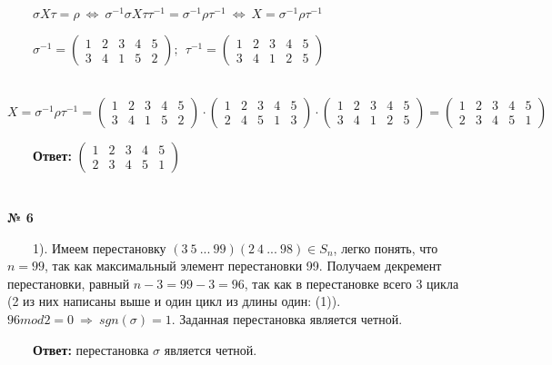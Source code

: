 \documentclass[a4paper, 12pt]{article}
\begin{document}
    \\
    \par \ \ \ \ $\sigma X \tau = \rho \ \Leftrightarrow \ \sigma^{-1} \sigma X \tau \tau^{-1} = \sigma^{-1} \rho \tau^{-1} \ \Leftrightarrow \ X = \sigma^{-1} \rho \tau^{-1}$
    \\
    \par \ \ \ \ $\sigma^{-1} = \begin{pmatrix}1 & 2 & 3 & 4 & 5\\3 & 4 & 1 & 5 & 2\end{pmatrix}; \ \ \tau^{-1} = \begin{pmatrix}1 & 2 & 3 & 4 & 5\\3 & 4 & 1 & 2 & 5\end{pmatrix}$
    \\
    \par \ \ \ \ $X = \sigma^{-1} \rho \tau^{-1} = \begin{pmatrix}1 & 2 & 3 & 4 & 5\\3 & 4 & 1 & 5 & 2\end{pmatrix} \cdot \begin{pmatrix}1 & 2 & 3 & 4 & 5\\2 & 4 & 5 & 1 & 3 \end{pmatrix} \cdot \begin{pmatrix}1 & 2 & 3 & 4 & 5\\3 & 4 & 1 & 2 & 5\end{pmatrix} = \begin{pmatrix}1 & 2 & 3 & 4 & 5\\2 & 3 & 4 & 5 & 1\end{pmatrix}$
    \\
    \par \ \ \ \ \textbf{Ответ: } $\begin{pmatrix}1 & 2 & 3 & 4 & 5\\2 & 3 & 4 & 5 & 1\end{pmatrix}$
    \\\\
    \\ \textbf{№ 6} 
    \par \ \ \ \ 1). Имеем перестановку $(3 \ 5 \ ... \ 99)(2 \ 4 \ ... \ 98) \in S_n$, 
    легко понять, что $n = 99$, так как максимальный элемент перестановки 99. 
    Получаем декремент перестановки, равный $n - 3 = 99 - 3 = 96$, 
    так как в перестановке всего 3 цикла (2 из них написаны выше и один цикл из длины один: (1)). $96 mod 2 = 0 \ \Rightarrow \ sgn(\sigma) = 1$. Заданная перестановка является четной.
    \par \ \ \ \ \textbf{Ответ: } перестановка $\sigma$ является четной.
\end{document}
